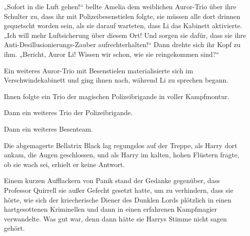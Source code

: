 „Sofort in die Luft gehen!“ bellte Amelia dem weiblichen Auror-Trio über ihre Schulter zu, dass ihr mit Polizeibesenstielen folgte, sie müssen alle dort drinnen gequetscht worden sein, als sie darauf warteten, dass Li das Kabinett aktivierte.
„Ich will mehr Luftsicherung über diesem Ort! Und sorgen sie dafür, dass sie ihre Anti-Desillusionierungs-Zauber aufrechterhalten!“ Dann drehte sich ihr Kopf zu ihm.
„Bericht, Auror Li! Wissen wir schon, wie sie reingekommen sind?“

Ein weiteres Auror-Trio mit Besenstielen materialisierte sich im Verschwindekabinett und ging ihnen nach, während Li zu sprechen begann.

Ihnen folgte ein Trio der magischen Polizeibrigande in voller Kampfmontur.

Dann ein weiteres Trio der Polizeibrigande.

Dann ein weiteres Besenteam.

\later

Die abgemagerte Bellatrix Black lag regungslos auf der Treppe, als Harry dort ankam, die Augen geschlossen, und als Harry im kalten, hohen Flüstern fragte, ob sie wach sei, erhielt er keine Antwort.

Einem kurzen Aufflackern von Panik stand der Gedanke gegenüber, dass Professor Quirrell sie außer Gefecht gesetzt hatte, um zu verhindern, dass sie hörte, wie sich der kriecherische Diener des Dunklen Lords plötzlich in einen hartgesottenen Kriminellen und dann in einen erfahrenen Kampfmagier verwandelte. Was gut war, denn dann hätte sie Harrys Stimme nicht  sagen gehört.

